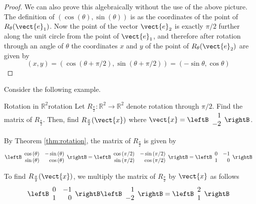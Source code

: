 \begin{proof}
We can also prove this algebraically without the use of the
above picture. The definition of $\left(
\cos \left( \theta \right) ,\sin \left( \theta \right) \right) $ is as the 
coordinates of the point of $R_{\theta}(\vect{e}_{1})$.  Now the point of
the vector $\vect{e}_{2}$ is exactly $\pi /2$ further along the unit circle from 
the point of $\vect{e}_{1}$, and therefore after rotation through an angle of $\theta $ the coordinates
$x$ and $y$ of the point of $R_{\theta}(\vect{e}_{2})$ are given by
\begin{equation*}
\left( x,y\right) =\left( \cos \left( \theta +\pi /2\right) ,\sin \left(
\theta +\pi /2\right) \right) =\left( -\sin \theta ,\cos \theta \right) 
\end{equation*}

\end{proof}

Consider the following example. 

\begin{example}{Rotation in $\mathbb{R}^2$}{rotation}
Let $R_{\frac{\pi}{2}}: \mathbb{R}^2 \to \mathbb{R}^2$ denote rotation through $\pi/2$. Find the matrix of $R_{\frac{\pi}{2}}$. Then, find $R_{\frac{\pi}{2}} (\vect{x})$ where $\vect{x} = \leftB
\begin{array}{r}
1 \\
-2
\end{array}
\rightB$. 
\end{example}

\begin{solution}
By Theorem \ref{thm:rotation}, the matrix of $R_{\frac{\pi}{2}}$ is given by
\[
\leftB
\begin{array}{rr}
\cos \left( \theta \right) & -\sin \left( \theta \right) \\
\sin \left( \theta \right) & \cos \left( \theta \right)
\end{array}
\rightB
=
\leftB
\begin{array}{rr}
\cos \left( \pi/2 \right) & -\sin \left( \pi/2 \right) \\
\sin \left( \pi/2 \right) & \cos \left( \pi/2 \right)
\end{array}
\rightB
=
\leftB
\begin{array}{rr}
0 & -1 \\
1 & 0 
\end{array}
\rightB
\]

To find $R_{\frac{\pi}{2}} (\vect{x})$, we multiply the matrix of $R_{\frac{\pi}{2}}$ by $\vect{x}$ as follows
\[
\leftB
\begin{array}{rr}
0 & -1 \\
1 & 0 
\end{array}
\rightB
\leftB
\begin{array}{r}
1 \\
-2 
\end{array}
\rightB
=
\leftB
\begin{array}{r}
2 \\
1
\end{array}
\rightB
\]

\end{solution}

